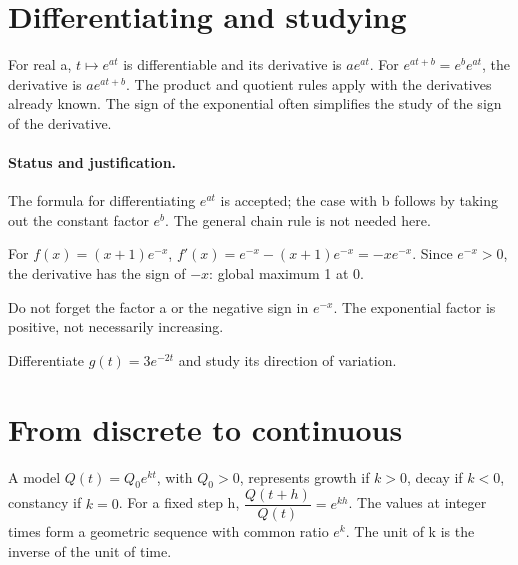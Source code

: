 \section{Differentiating and studying}\label{C09-U3}
\begin{keypoint}
For real a, $t\mapsto e^{at}$ is differentiable and its derivative is $ae^{at}$. For $e^{at+b}=e^be^{at}$, the derivative is $ae^{at+b}$. The product and quotient rules apply with the derivatives already known. The sign of the exponential often simplifies the study of the sign of the derivative.
\end{keypoint}
\paragraph{Status and justification.} The formula for differentiating $e^{at}$ is accepted; the case with b follows by taking out the constant factor $e^b$. The general chain rule is not needed here.
\begin{example}For $f(x)=(x+1)e^{-x}$, $f\prime(x)=e^{-x}-(x+1)e^{-x}=-xe^{-x}$. Since $e^{-x}>0$, the derivative has the sign of $-x$: global maximum 1 at 0.\end{example}\label{C09-EX3}
\begin{pitfall}Do not forget the factor a or the negative sign in $e^{-x}$. The exponential factor is positive, not necessarily increasing.\end{pitfall}
\begin{application}Differentiate $g(t)=3e^{-2t}$ and study its direction of variation.\end{application}\label{C09-AP3}
\section{From discrete to continuous}\label{C09-U4}
\begin{keypoint}
A model $Q(t)=Q_0e^{kt}$, with $Q_0>0$, represents growth if $k>0$, decay if $k<0$, constancy if $k=0$. For a fixed step h, $\dfrac{Q(t+h)}{Q(t)}=e^{kh}$. The values at integer times form a geometric sequence with common ratio $e^k$. The unit of k is the inverse of the unit of time.
\end{keypoint}
